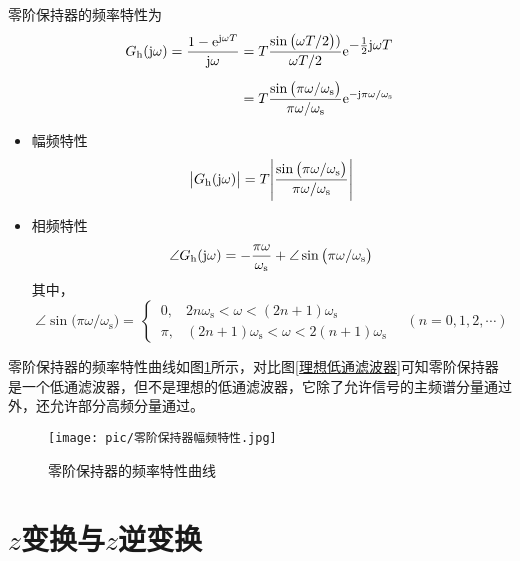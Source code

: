 \noindent 零阶保持器的频率特性为
\begin{align}
	G_\text{h} (\text{j} \omega) = \dfrac{1 - {\rm{e}}^{\text{j} \omega T}}{\text{j} \omega} &= T \dfrac{\sin \big(\omega T / 2\big))}{\omega T /2} {\rm{e}}^{\textstyle -\frac{1}{2} \text{j} \omega T} \notag \\[0.5em]
	&= T \dfrac{\sin \big(\pi \omega / \omega_\text{s}\big)}{\pi \omega / \omega_\text{s}}{\rm{e}}^{- \text{j} \pi\omega /\omega_\text{s}}
\end{align}
\begin{itemize}
	\item 幅频特性
	\begin{equation}
		\big|G_\text{h}(\text{j} \omega)\big| = T \Bigg|\dfrac{\sin \big(\pi \omega / \omega_\text{s}\big)}{\pi \omega / \omega_\text{s}}\Bigg|
	\end{equation}
	\item 相频特性
	\begin{equation}
		\angle G_\text{h}(\text{j} \omega) = - \dfrac{\pi \omega}{\omega_\text{s}} + \angle \sin \big(\pi \omega / \omega_\text{s}\big)
	\end{equation}
	其中，
	\begin{equation}
		\angle \sin \big(\pi \omega / \omega_\text{s}\big) =
		\, \begin{cases}
			\,0, & 2n\omega_\text{s}<\omega < (2n+1)\omega_\text{s}\\[0.5em]
			\, \pi, & (2n+1)\omega_\text{s} < \omega < 2(n+1)\omega_\text{s}
		\end{cases}
		\quad (n = 0,1,2,\cdots)
	\end{equation}
\end{itemize}

零阶保持器的频率特性曲线如图\ref{零阶保持器幅频特性}所示，对比图\ref{理想低通滤波器}可知零阶保持器是一个低通滤波器，但不是理想的低通滤波器，它除了允许信号的主频谱分量通过外，还允许部分高频分量通过。
\begin{figure}[!htb]
	\centering
	\texttt{[image: pic/零阶保持器幅频特性.jpg]}
	\vspace*{-1em}
	\caption{零阶保持器的频率特性曲线}
	\label{零阶保持器幅频特性}
\end{figure}

\section{$z$变换与$z$逆变换}
